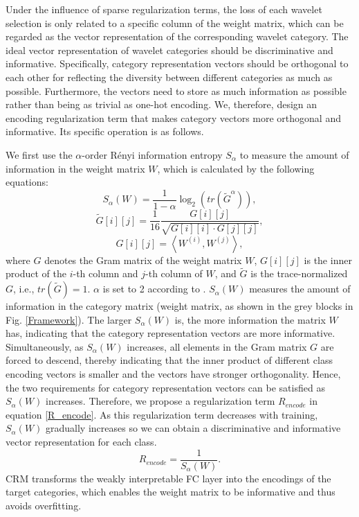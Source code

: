 \documentclass[letterpaper]{article} %
\begin{document}
	Under the influence of sparse regularization terms, the loss of each wavelet selection is only related to a specific column of the weight matrix, which can be regarded as the vector representation of the corresponding wavelet category. The ideal vector representation of wavelet categories should be discriminative and informative. Specifically, category representation vectors should be orthogonal to each other for reflecting the diversity between different categories as much as possible. Furthermore, the vectors need to store as much information as possible rather than being as trivial as one-hot encoding.
	We, therefore, design an encoding regularization term that makes category vectors more orthogonal and informative. Its specific operation is as follows.

	We first use the $\alpha$-order Rényi information entropy $S_\alpha$ to measure the amount of information in the weight matrix $W$, which is calculated by the following equations:
	\begin{equation}
		\label{S_alpha}
		{S_\alpha }(W) = \frac{1}{{1 - \alpha }}{\log _2}(tr({\tilde G^\alpha })),
	\end{equation}
	\begin{equation}
		\label{G tilde}
		\tilde G[i][j] = \frac{1}{{16}}\frac{{G[i][j]}}{{\sqrt {G[i][i] \cdot G[j][j]} }},
	\end{equation}
	\begin{equation}
		\label{G}
		G[i][j] = \left\langle {{W^{(i)}},{W^{(j)}}} \right\rangle,
	\end{equation}
	where $G$ denotes the Gram matrix of the weight matrix $W$, $G[i][j]$ is the inner product of the $i$-th column and $j$-th column of $W$, and $\tilde G$ is the trace-normalized $G$, i.e., $tr(\tilde G)=1$. $\alpha$ is set to 2 according to \cite{8787866, 8998186}.
	${S_\alpha}(W)$ measures the amount of information in the category matrix (weight matrix, as shown in the grey blocks in Fig. \ref{Framework}). The larger ${S_\alpha}(W)$ is, the more information the matrix $W$ has, indicating that the category representation vectors are more informative. Simultaneously, as ${S_\alpha}(W)$ increases, all elements in the Gram matrix $G$ are forced to descend, thereby indicating that the inner product of different class encoding vectors is smaller and the vectors have stronger orthogonality. Hence, the two requirements for category representation vectors can be satisfied as ${S_\alpha}(W)$ increases. Therefore, we propose a regularization term $R_{encode}$ in equation \ref{R_encode}. As this regularization term decreases with training, ${S_\alpha}(W)$ gradually increases so we can obtain a discriminative and informative vector representation for each class.
	\begin{equation}
		\label{R_encode}
		{R_{encode}} = \frac{1}{{{S_\alpha}(W)}}.
	\end{equation}
	CRM transforms the weakly interpretable FC layer into the encodings of the target categories, which enables the weight matrix to be informative and thus avoids overfitting.
\end{document}
